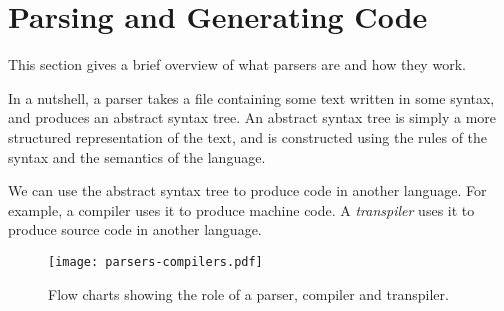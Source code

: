 \section{Parsing and Generating Code} %
\label{sec:parsing_and_generating}
This section gives a brief overview of what parsers are and how they work.

In a nutshell, a parser takes a file containing some text written in some syntax, and produces an abstract syntax tree. An abstract syntax tree is simply a more structured representation of the text, and is constructed using the rules of the syntax and the semantics of the language. 

We can use the abstract syntax tree to produce code in another language. For example, a compiler uses it to produce machine code. A \emph{transpiler} uses it to produce source code in another language.

\begin{figure}[ht]
  \centering
  \texttt{[image: parsers-compilers.pdf]} 
  \caption{Flow charts showing the role of a parser, compiler and transpiler.}
  \label{fig:parsers-compilers}
\end{figure}


